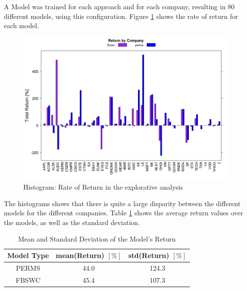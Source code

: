 A Model was trained for each approach and for each company, resulting in 80 different models, using this configuration. Figure \ref{fig_firstRunReturnByCompany} shows the rate of return for each model.

\begin{figure}[h]
	\centering
  	\includegraphics[width=\textwidth]{firstRunReturnByCompany}
	\caption[Rate of Return Barchart]{Histogram: Rate of Return in the explorative analysis}
	\label{fig_firstRunReturnByCompany}
\end{figure}

The histograms shows that there is quite a large disparity between the different models for the different companies. Table \ref{table_firstRunReturn} shows the average return values over the models, as well as the standard deviation.

\begin{table}	
\vspace{0.5cm}
\caption[Model Performance (Return)]{Mean and Standard Deviation of the Model's Return\label{table_firstRunReturn}}
\centering
\begin{tabular}{ c | c | c }		
  Model Type & mean(Return)  $[\%]$ & std(Return) $[\%]$ \\
  \hline
  PERMS & 44.0 & 124.3 \\
  FBSWC & 45.4 & 107.3 \\
\end{tabular}
\vspace{0.5cm}
\end{table}

